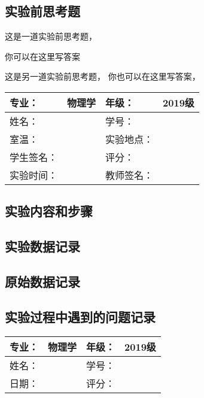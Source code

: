 \documentclass[dvipsnames, svgnames,a4paper,11pt]{article}
\begin{document}
\subsection{实验前思考题}
\begin{question}
	这是一道实验前思考题，\lipsum[10]
\end{question}
你可以在这里写答案

\begin{question}
	这是另一道实验前思考题，\lipsum[11]
	\tcblower
	你也可以在这里写答案，\lipsum[12]
\end{question}

\clearpage
\begin{table}
	\renewcommand\arraystretch{1.7}
	\centering
	\begin{tabularx}{\textwidth}{|X|X|X|X|}
	\hline
	专业：& 物理学 &年级：& 2019级 \\
	\hline
	姓名： & & 学号：&\\
	\hline
	室温：& & 实验地点： & \\
	\hline
	学生签名：& & 评分： &\\
	\hline
	实验时间：& & 教师签名：&\\
	\hline
	\end{tabularx}
\end{table}

\subsection{实验内容和步骤}
\subsection{实验数据记录}
\subsection{原始数据记录}
\subsection{实验过程中遇到的问题记录}



\clearpage
\begin{table}
	\renewcommand\arraystretch{1.7}
	\begin{tabularx}{\textwidth}{|X|X|X|X|}
	\hline
	专业：& 物理学 &年级：& 2019级\\
	\hline
	姓名： & & 学号：& \\
	\hline
    日期：& & 评分： &\\
	\hline
	\end{tabularx}
\end{table}
\end{document}
